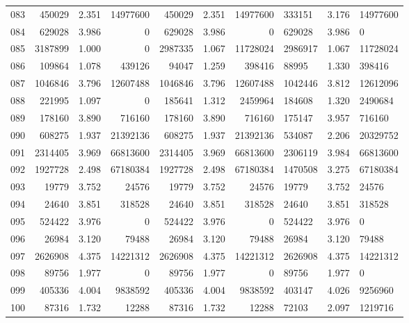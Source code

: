 \begin{longtable}{crrrrrr}
083 & 450029 & 2.351 & 14977600 & 450029 & 2.351 & 14977600 & 333151 & 3.176 & 14977600 \\
084 & 629028 & 3.986 & 0 & 629028 & 3.986 & 0 & 629028 & 3.986 & 0 \\
085 & 3187899 & 1.000 & 0 & 2987335 & 1.067 & 11728024 & 2986917 & 1.067 & 11728024 \\
086 & 109864 & 1.078 & 439126 & 94047 & 1.259 & 398416 & 88995 & 1.330 & 398416 \\
087 & 1046846 & 3.796 & 12607488 & 1046846 & 3.796 & 12607488 & 1042446 & 3.812 & 12612096 \\
088 & 221995 & 1.097 & 0 & 185641 & 1.312 & 2459964 & 184608 & 1.320 & 2490684 \\
089 & 178160 & 3.890 & 716160 & 178160 & 3.890 & 716160 & 175147 & 3.957 & 716160 \\
090 & 608275 & 1.937 & 21392136 & 608275 & 1.937 & 21392136 & 534087 & 2.206 & 20329752 \\
091 & 2314405 & 3.969 & 66813600 & 2314405 & 3.969 & 66813600 & 2306119 & 3.984 & 66813600 \\
092 & 1927728 & 2.498 & 67180384 & 1927728 & 2.498 & 67180384 & 1470508 & 3.275 & 67180384 \\
093 & 19779 & 3.752 & 24576 & 19779 & 3.752 & 24576 & 19779 & 3.752 & 24576 \\
094 & 24640 & 3.851 & 318528 & 24640 & 3.851 & 318528 & 24640 & 3.851 & 318528 \\
095 & 524422 & 3.976 & 0 & 524422 & 3.976 & 0 & 524422 & 3.976 & 0 \\
096 & 26984 & 3.120 & 79488 & 26984 & 3.120 & 79488 & 26984 & 3.120 & 79488 \\
097 & 2626908 & 4.375 & 14221312 & 2626908 & 4.375 & 14221312 & 2626908 & 4.375 & 14221312 \\
098 & 89756 & 1.977 & 0 & 89756 & 1.977 & 0 & 89756 & 1.977 & 0 \\
099 & 405336 & 4.004 & 9838592 & 405336 & 4.004 & 9838592 & 403147 & 4.026 & 9256960 \\
100 & 87316 & 1.732 & 12288 & 87316 & 1.732 & 12288 & 72103 & 2.097 & 1219716 \\
\end{longtable}

